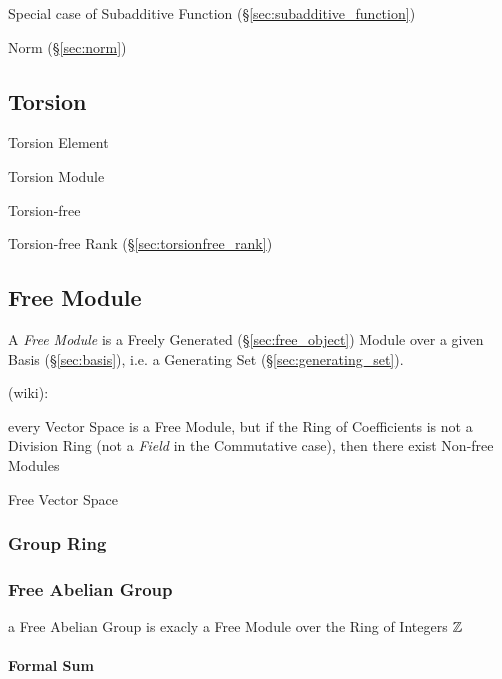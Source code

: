 Special case of Subadditive Function (\S\ref{sec:subadditive_function})

Norm (\S\ref{sec:norm})



\subsection{Torsion}\label{sec:torsion}

Torsion Element

Torsion Module

Torsion-free

Torsion-free Rank (\S\ref{sec:torsionfree_rank})



\subsection{Free Module}\label{sec:free_module}

A \emph{Free Module} is a Freely Generated (\S\ref{sec:free_object}) Module
over a given Basis (\S\ref{sec:basis}), i.e. a Generating Set
(\S\ref{sec:generating_set}).

(wiki):

every Vector Space is a Free Module, but if the Ring of Coefficients is not a
Division Ring (not a \emph{Field} in the Commutative case), then there exist
Non-free Modules

Free Vector Space



\subsubsection{Group Ring}\label{sec:group_ring}

\subsubsection{Free Abelian Group}\label{sec:free_commutative_group}

a Free Abelian Group is exacly a Free Module over the Ring of Integers $\mathbb{Z}$



\paragraph{Formal Sum}\label{sec:formal_sum}\hfill



